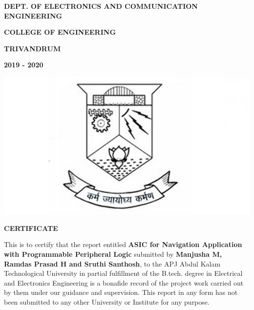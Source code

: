 \documentclass[12pt,a4paper]{report}
\begin{document}
\thispagestyle{empty}
\newpage
\begin{center}


\textbf{DEPT. OF ELECTRONICS AND COMMUNICATION ENGINEERING}

\textbf{COLLEGE OF ENGINEERING}

\textbf{TRIVANDRUM}

\textbf{2019 - 2020}
\end{center}
\begin{center}
\includegraphics[scale=0.6]{CET_logo.jpeg}

\end{center}
\begin{center}
 \textbf{\large{CERTIFICATE}}
\end{center}
 
This is to certify that the report entitled \textbf{ \large ASIC for Navigation Application with Programmable Peripheral Logic} submitted by \textbf{Manjusha M, Ramdas Prasad H and Sruthi Santhosh}, to the APJ Abdul Kalam Technological University in partial fulfillment of the B.tech. degree in Electrical and Electronics Engineering is a bonafide record of the project work carried out by them under our
guidance and supervision. This report in any form has not been submitted to any other University or Institute for any purpose.
\end{document}
